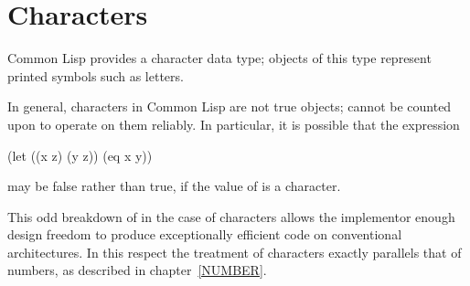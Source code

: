 
\clearpage\def\pagestatus{FINAL PROOF}

\chapter{Characters}

Common Lisp provides a character data type; objects of this type
represent printed symbols such as letters.

In general, characters in Common Lisp are not true objects;  cannot
be counted upon to operate on them reliably.  In particular,
it is possible that the expression
\begin{lisp}
(let ((x z) (y z)) (eq x y))
\end{lisp}
may be false rather than true, if the value of  is a character.

\beforenoterule
\begin{rationale}
This odd breakdown of  in the case of characters
allows the implementor enough design freedom to produce exceptionally
efficient code on conventional architectures.  In this respect the
treatment of characters exactly parallels that of numbers, as described
in chapter~\ref{NUMBER}.
\end{rationale}
\afternoterule

